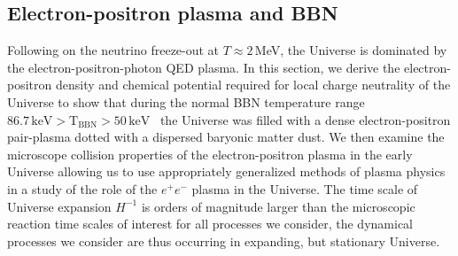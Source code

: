 \subsection{Electron-positron plasma and BBN}
\label{section:electron}
Following on the neutrino freeze-out at $T\approx 2$\,MeV, the Universe is dominated by the electron-positron-photon QED plasma. In this section, we derive the electron-positron density and chemical potential required for local charge neutrality of the Universe to show that during the normal BBN temperature range $86.7\,\mathrm{keV}>\mathrm{T_{BBN}}>50\,\mathrm{keV}$~\cite{Pitrou:2018cgg} the Universe was filled with a dense electron-positron pair-plasma dotted with a dispersed baryonic matter dust. We then examine the microscope collision properties of the electron-positron plasma in the early Universe allowing us to use  appropriately generalized methods of plasma physics in a study of the role of the $e^+e^-$ plasma in the Universe. The time scale of Universe expansion $H^{-1}$ is orders of magnitude larger than the microscopic reaction time scales of interest for all processes we consider, the dynamical processes we consider are  thus occurring in expanding, but stationary Universe.


